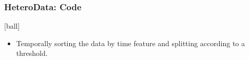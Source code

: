 \documentclass{beamer}
\begin{document}

\begin{frame}[fragile]
\frametitle{HeteroData: Code}
[ball]



\end{frame}


\begin{frame}[fragile]
\begin{itemize}
\frametitle{Temporal Train-Test Split}
[ball]

\item Temporally sorting the data by time feature and splitting according to a threshold.

\vspace{0.3cm}



\end{itemize}
\end{frame}

\end{document}
